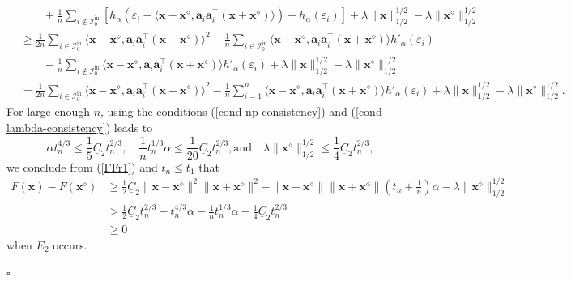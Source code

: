 \documentclass[10pt,a4paper]{amsart}
\newenvironment{proof}{{\noindent\bf Proof.}\,}{\hfill $\square$\par\mbox{}}
\begin{document}
\begin{proof}
\begin{equation}
\begin{aligned}
			&\qquad+\frac{1}{n}\sum_{i\notin\mathcal{I}_{0}^{\mathrm{in}}}[h_{\alpha}(\varepsilon_i-\langle \mathbf{x}-\mathbf{x}^\diamond, \mathbf{a}_i\mathbf{a}_i^\top(\mathbf{x}+\mathbf{x}^\diamond)\rangle)-h_{\alpha}(\varepsilon_i)]+\lambda\|\mathbf{x}\|_{1/2}^{1/2}-\lambda\|\mathbf{x}^\diamond\|_{1/2}^{1/2}\\
			&\geq\frac{1}{2n}\sum_{i\in\mathcal{I}_{0}^{\mathrm{in}}}\langle \mathbf{x}-\mathbf{x}^\diamond, \mathbf{a}_i\mathbf{a}_i^\top(\mathbf{x}+\mathbf{x}^\diamond)\rangle^2
			-\frac{1}{n}\sum_{i\in\mathcal{I}_{0}^{\mathrm{in}}}\langle \mathbf{x}-\mathbf{x}^\diamond, \mathbf{a}_i\mathbf{a}_i^\top(\mathbf{x}+\mathbf{x}^\diamond)\rangle h'_{\alpha}(\varepsilon_i)\\
			&\qquad-\frac{1}{n}\sum_{i\notin\mathcal{I}_{0}^{\mathrm{in}}}\langle \mathbf{x}-\mathbf{x}^\diamond, \mathbf{a}_i\mathbf{a}_i^\top(\mathbf{x}+\mathbf{x}^\diamond)\rangle h'_{\alpha}(\varepsilon_i)	+\lambda\|\mathbf{x}\|_{1/2}^{1/2}-\lambda\|\mathbf{x}^\diamond\|_{1/2}^{1/2}\\
			&=\frac{1}{2n}\sum_{i\in\mathcal{I}_{0}^{\mathrm{in}}}\langle \mathbf{x}-\mathbf{x}^\diamond, \mathbf{a}_i\mathbf{a}_i^\top(\mathbf{x}+\mathbf{x}^\diamond)\rangle^2
			-\frac{1}{n}\sum_{i=1}^n\langle \mathbf{x}-\mathbf{x}^\diamond, \mathbf{a}_i\mathbf{a}_i^\top(\mathbf{x}+\mathbf{x}^\diamond)\rangle h'_{\alpha}(\varepsilon_i)
			+\lambda\|\mathbf{x}\|_{1/2}^{1/2}-\lambda\|\mathbf{x}^\diamond\|_{1/2}^{1/2}.
		\end{aligned}
	\end{equation}
	For large enough $n$, using the conditions (\ref{cond-np-consistency}) and (\ref{cond-lambda-consistency}) leads to $$\alpha t_n^{4/3}\leq\frac{1}{5}\underline{C}_2t_n^{2/3},\quad \frac{1}{n} t_n^{1/3}\alpha\leq\frac{1}{20}\underline{C}_2t_n^{2/3}, \mbox{and}\quad\lambda\|\mathbf{x}^\diamond\|_{1/2}^{1/2}\leq\frac{1}{4}\underline{C}_2t_n^{2/3},$$
	we conclude from (\ref{FFr1}) and $t_n\leq t_1$ that \begin{equation}
		\begin{aligned}
			F(\mathbf{x})-F(\mathbf{x}^\diamond)
			&\geq\frac{1}{2}\underline{C}_2\|\mathbf{x}-\mathbf{x}^\diamond\|^2\|\mathbf{x}+\mathbf{x}^\diamond\|^2-\|\mathbf{x}-\mathbf{x}^\diamond\|\|\mathbf{x}+\mathbf{x}^\diamond\|(t_n+\frac{1}{n})\alpha
			-\lambda\|\mathbf{x}^\diamond\|_{1/2}^{1/2}\\
			&>\frac{1}{2}\underline{C}_2t_n^{2/3}-t_n^{4/3}\alpha-\frac{1}{n} t_n^{1/3}\alpha
			-\frac{1}{4}\underline{C}_2t_n^{2/3}\\
			&\geq0
		\end{aligned}
	\end{equation}
	 when $E_2$ occurs.
	

\end{proof}
\end{document}
